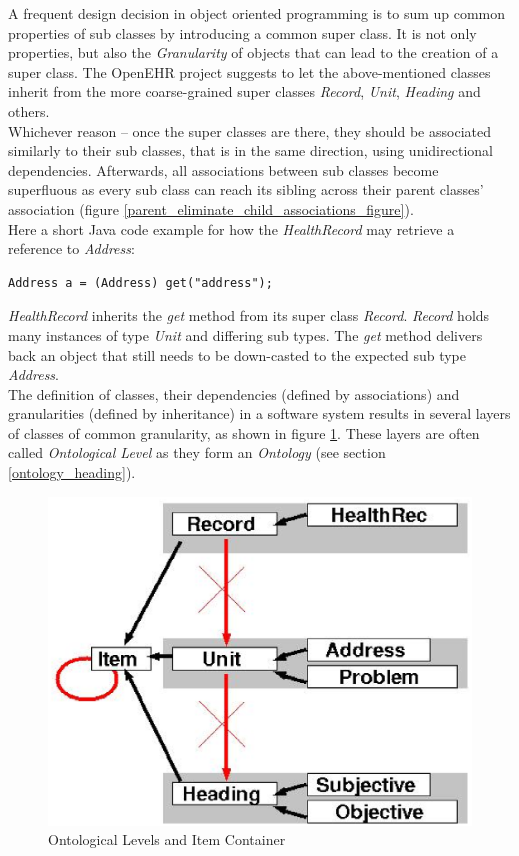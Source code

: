A frequent design decision in object oriented programming is to sum up common
properties of sub classes by introducing a common super class. It is not only
properties, but also the \emph{Granularity} of objects that can lead to the
creation of a super class. The OpenEHR project \cite{openehr} suggests to let
the above-mentioned classes inherit from the more coarse-grained super classes
\emph{Record}, \emph{Unit}, \emph{Heading} and others.\\
Whichever reason -- once the super classes are there, they should be associated
similarly to their sub classes, that is in the same direction, using unidirectional
dependencies. Afterwards, all associations between sub classes become superfluous
as every sub class can reach its sibling across their parent classes' association
(figure \ref{parent_eliminate_child_associations_figure}).\\
Here a short Java code example for how the \emph{HealthRecord} may retrieve a
reference to \emph{Address}:
\begin{verbatim}
Address a = (Address) get("address");
\end{verbatim}
\emph{HealthRecord} inherits the \emph{get} method from its super class \emph{Record}.
\emph{Record} holds many instances of type \emph{Unit} and differing sub types.
The \emph{get} method delivers back an object that still needs to be down-casted
to the expected sub type \emph{Address}.\\
The definition of classes, their dependencies (defined by associations) and granularities
(defined by inheritance) in a software system results in several layers of classes of
common granularity, as shown in figure \ref{ontological_levels_and_item_container_figure}.
These layers are often called \emph{Ontological Level} as they form an \emph{Ontology}
(see section \ref{ontology_heading}).

\begin{figure}[ht]
    \begin{center}
        \includegraphics[scale=0.4]{vector/ontological_levels_and_item_container.eps}
        \caption{Ontological Levels and Item Container}
        \label{ontological_levels_and_item_container_figure}
    \end{center}
\end{figure}

